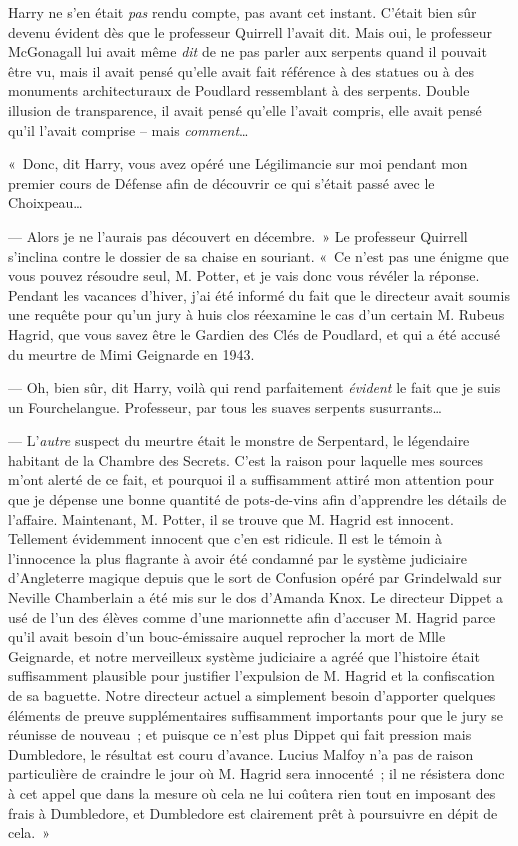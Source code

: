 Harry ne s'en était \emph{pas} rendu compte, pas avant cet instant. C'était bien sûr devenu évident dès que le professeur Quirrell l'avait dit. Mais oui, le professeur McGonagall lui avait même \emph{dit} de ne pas parler aux serpents quand il pouvait être vu, mais il avait pensé qu'elle avait fait référence à des statues ou à des monuments architecturaux de Poudlard ressemblant à des serpents. Double illusion de transparence, il avait pensé qu'elle l'avait compris, elle avait pensé qu'il l'avait comprise -- mais \emph{comment}…

«~Donc, dit Harry, vous avez opéré une Légilimancie sur moi pendant mon premier cours de Défense afin de découvrir ce qui s'était passé avec le Choixpeau…

--- Alors je ne l'aurais pas découvert en décembre.~» Le professeur Quirrell s'inclina contre le dossier de sa chaise en souriant. «~Ce n'est pas une énigme que vous pouvez résoudre seul, M. Potter, et je vais donc vous révéler la réponse. Pendant les vacances d'hiver, j'ai été informé du fait que le directeur avait soumis une requête pour qu'un jury à huis clos réexamine le cas d'un certain M. Rubeus Hagrid, que vous savez être le Gardien des Clés de Poudlard, et qui a été accusé du meurtre de Mimi Geignarde en 1943.

--- Oh, bien sûr, dit Harry, voilà qui rend parfaitement \emph{évident} le fait que je suis un Fourchelangue. Professeur, par tous les suaves serpents susurrants…

--- L'\emph{autre} suspect du meurtre était le monstre de Serpentard, le légendaire habitant de la Chambre des Secrets. C'est la raison pour laquelle mes sources m'ont alerté de ce fait, et pourquoi il a suffisamment attiré mon attention pour que je dépense une bonne quantité de pots-de-vins afin d'apprendre les détails de l'affaire. Maintenant, M. Potter, il se trouve que M. Hagrid est innocent. Tellement évidemment innocent que c'en est ridicule. Il est le témoin à l'innocence la plus flagrante à avoir été condamné par le système judiciaire d'Angleterre magique depuis que le sort de Confusion opéré par Grindelwald sur Neville Chamberlain a été mis sur le dos d'Amanda Knox. Le directeur Dippet a usé de l'un des élèves comme d'une marionnette afin d'accuser M. Hagrid parce qu'il avait besoin d'un bouc-émissaire auquel reprocher la mort de Mlle Geignarde, et notre merveilleux système judiciaire a agréé que l'histoire était suffisamment plausible pour justifier l'expulsion de M. Hagrid et la confiscation de sa baguette. Notre directeur actuel a simplement besoin d'apporter quelques éléments de preuve supplémentaires suffisamment importants pour que le jury se réunisse de nouveau~; et puisque ce n'est plus Dippet qui fait pression mais Dumbledore, le résultat est couru d'avance. Lucius Malfoy n'a pas de raison particulière de craindre le jour où M. Hagrid sera innocenté~; il ne résistera donc à cet appel que dans la mesure où cela ne lui coûtera rien tout en imposant des frais à Dumbledore, et Dumbledore est clairement prêt à poursuivre en dépit de cela.~»

